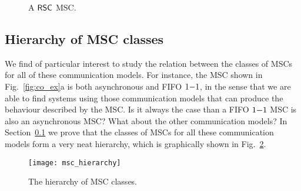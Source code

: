 \begin{figure}[h]
	\begin{center}
		\caption{A $\mathsf{RSC}$ MSC.}
		\label{fig:rsc_ex}
	\end{center}
\end{figure}

\subsection{Hierarchy of MSC classes}
We find of particular interest to study the relation between the classes of MSCs for all of these communication models. For instance, the MSC shown in Fig.~\ref{fig:co_ex}a is both asynchronous and FIFO $1\mathsf{-}1$, in the sense that we are able to find systems using those communication models that can produce the behaviour described by the MSC. Is it always the case than a FIFO $1\mathsf{-}1$ MSC is also an asynchronous MSC? What about the other communication models? In Section~\ref{} we prove that the classes of MSCs for all these communication models form a very neat hierarchy, which is graphically shown in Fig.~\ref{fig:msc_hierarchy_full}.

\begin{figure}[h]
	\centering
	\texttt{[image: msc\_hierarchy]}
	\caption{The hierarchy of MSC classes.}
	\label{fig:msc_hierarchy_full}
\end{figure}